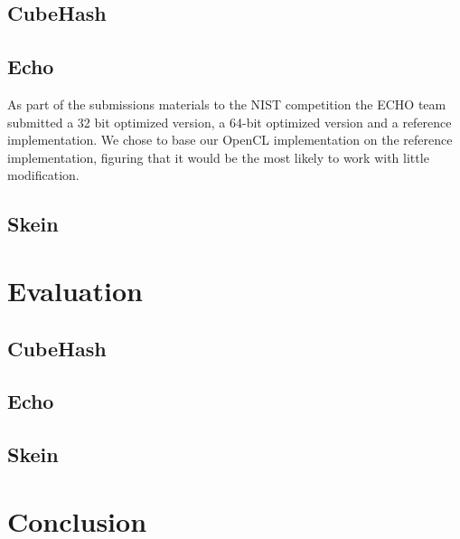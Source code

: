 \documentclass{article}
\begin{document}
\subsection*{CubeHash}

\subsection*{Echo}

As part of the submissions materials to the NIST competition the ECHO team submitted a 32 bit optimized version, a 64-bit optimized version and a reference implementation.  
We chose to base our OpenCL implementation on the reference implementation, figuring that it would be the most likely to work with little modification.

\subsection*{Skein}


\section*{Evaluation}

\subsection*{CubeHash}

\subsection*{Echo}

\subsection*{Skein}

\section*{Conclusion}
\end{document}

